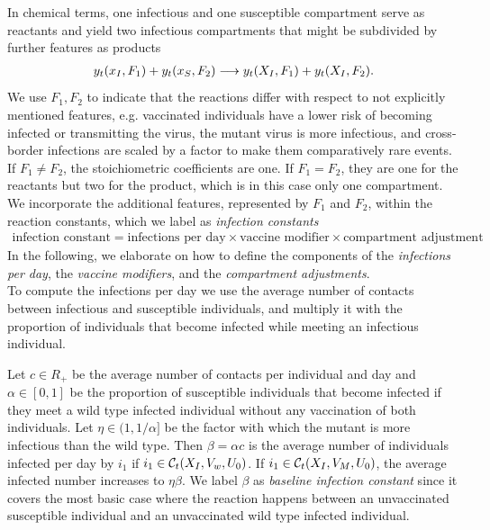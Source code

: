 In chemical terms, one infectious and one susceptible compartment serve as reactants and yield two infectious compartments that might be subdivided by further features as products
\begin{align}
\label{eq:general_infection}
y_t(x_I, F_1) + y_t(x_S, F_2) \longrightarrow y_t(X_I, F_1) + y_t(X_I, F_2).
\end{align}
We use $F_1, F_2$ to indicate that the reactions differ with respect to not explicitly mentioned features, e.g. vaccinated individuals have a lower risk of becoming infected or transmitting the virus, the mutant virus is more infectious, and cross-border infections are scaled by a factor to make them comparatively rare events. If $F_1 \neq F_2$, the stoichiometric coefficients are one. If $F_1=F_2$, they are one for the reactants but two for the product, which is in this case only one compartment. We incorporate the additional features, represented by $F_1$ and $F_2$, within the reaction constants, which we label as \textit{infection constants}
\begin{align*}
\text{infection constant} = \text{infections per day} \times \text{vaccine modifier} \times \text{compartment adjustment}
\end{align*}
In the following, we elaborate on how to define the components of the \textit{infections per day}, the \textit{vaccine modifiers}, and the \textit{compartment adjustments}.\\

To compute the infections per day we use the average number of contacts between infectious and susceptible individuals, and multiply it with the proportion of individuals that become infected while meeting an infectious individual.

Let $c \in R_+$ be the average number of contacts per individual and day and $\alpha \in [0,1]$ be the proportion of susceptible individuals that become infected if they meet a wild type infected individual without any vaccination of both individuals. Let $\eta \in (1, 1/\alpha]$ be the factor with which the mutant is more infectious than the wild type. Then $\beta = \alpha c$ is the average number of individuals infected per day by $i_1$ if $i_1 \in \mathcal{C}_t(X_I, V_w, U_0)$. If $i_1 \in \mathcal{C}_t(X_I, V_M, U_0)$, the average infected number increases to $\eta \beta$. We label $\beta$ as \textit{baseline infection constant} since it covers the most basic case where the reaction happens between an unvaccinated susceptible individual and an unvaccinated wild type infected individual. \\

